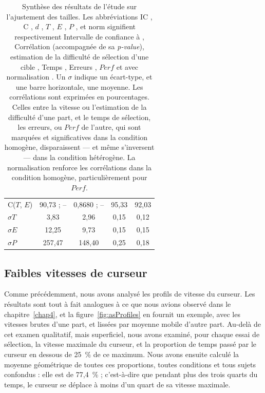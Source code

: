 \begin{table}
\begin{tabular}{l | c c c c}
		C($T$, $E$)		& 90,73 ; --				& 0,8680 ; --				& 95,33						& 92,03						\\
		$\sigma{}T$		& 3,83						& 2,96						& 0,15						& 0,12						\\
		$\sigma{}E$		& 12,25						& 9,73						& 0,15						& 0,15						\\
		$\sigma{}P$		& 257,47					& 148,40					& 0,25						& 0,18						\\
	\end{tabular}
	\caption[Synthèse des résultats de l'étude sur l'ajustement des tailles]{Synthèse des résultats de l'étude sur l'ajustement des tailles. Les abbréviations \og IC \fg{}, \og C \fg{}, \og $d$ \fg{}, \og $T$ \fg{}, \og $E$ \fg{}, \og $P$ \fg{}, et \og norm \fg{}  signifient respectivement \og Intervalle de confiance à \fg{}, \og Corrélation \fg{} (accompagnée de sa \emph{p-value}), \og estimation de la difficulté de sélection d'une cible \fg{}, \og Temps \fg{}, \og Erreurs \fg{}, \og $Perf$ \fg{} et \og avec normalisation \fg{}. Un $\sigma$ indique un écart-type, et une barre horizontale, une moyenne. Les corrélations sont exprimées en pourcentages. Celles entre la vitesse ou l'estimation de la difficulté d'une part, et le temps de sélection, les erreurs, ou $Perf$ de l'autre, qui sont marquées et significatives dans la condition homogène, disparaissent --- et même s'inversent --- dans la condition hétérogène. La normalisation renforce les corrélations dans la condition homogène, particulièrement pour $Perf$.}
	\label{tab:synthRes}
\end{table}


	\subsection{Faibles vitesses de curseur}
	Comme précédemment, nous avons analysé les profils de vitesse du curseur. Les résultats sont tout à fait analogues à ce que nous avions observé dans le chapitre~\ref{chap4}, et la figure~\ref{fig:asProfiles} en fournit un exemple, avec les vitesses brutes d'une part, et lissées par moyenne mobile d'autre part. Au-delà de cet examen qualitatif, mais superficiel, nous avons examiné, pour chaque essai de sélection, la vitesse maximale du curseur, et la proportion de temps passé par le curseur en dessous de 25~\%{} de ce maximum. Nous avons ensuite calculé la moyenne géométrique de toutes ces proportions, toutes conditions et tous sujets confondus : elle est de 77,4~\%{} ; c'est-à-dire que pendant plus des trois quarts du temps, le curseur se déplace à moins d'un quart de sa vitesse maximale.
	
